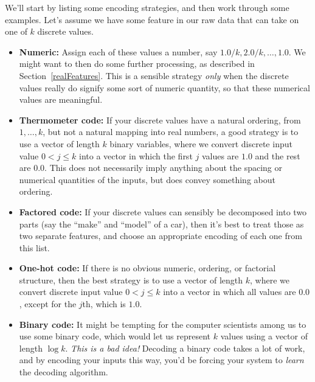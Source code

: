 We'll start by listing some encoding strategies, and then work through
some examples. Let's assume we have some feature in our raw data that
can take on one of $k$ discrete values.
\begin{itemize}
\item{\bf Numeric:}  Assign each of these values a number, say $1.0/k,
  2.0/k, \ldots, 1.0$.  We might want to then do some further processing, as
  described in Section~\ref{realFeatures}.  This is a sensible
  strategy {\em only} when the discrete values really do signify some
  sort of numeric quantity, so that these numerical values are meaningful.

\item{\bf Thermometer code:}  If your discrete values have a natural
  ordering, from $1, \ldots, k$, but not a natural mapping into real
  numbers, a good strategy is to use a vector of length $k$ binary
  variables, where we convert discrete input value $0 < j \leq k$ into
  a vector in which the first $j$ values are $1.0$ and the rest are
  $0.0$.  This does not necessarily imply anything about the spacing
  or numerical quantities of the inputs, but does convey something
  about ordering.

\item{\bf Factored code:}  If your discrete values can sensibly be
  decomposed into two parts (say the ``make'' and ``model'' of a car),
  then it's best to treat those as two separate features, and choose
  an appropriate encoding of each one from this list.

\item{\bf One-hot code:}  If there is no obvious numeric, ordering, or
  factorial structure, then the best strategy is to use a vector of
  length $k$, where we convert discrete input value $0 < j \leq k$
  into a vector in which all values are $0.0$, except for the $j$th,
  which is $1.0$.

\item{\bf Binary code:} It might be tempting for the computer
  scientists among us to use some binary code, which would let us
  represent $k$ values using a vector of length $\log k$.  {\em This
    is a bad idea!}  Decoding a binary code takes a lot of work, and
  by encoding your inputs this way, you'd be forcing your system to 
  {\em learn} the decoding algorithm.
\end{itemize}

